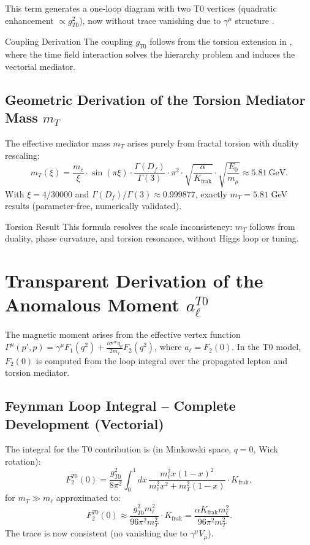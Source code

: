 \documentclass[12pt,a4paper]{article}
\begin{document}
	This term generates a one-loop diagram with two T0 vertices (quadratic enhancement $\propto g_{T0}^2$), now without trace vanishing due to $\gamma^\mu$ structure \cite{bell_muon}.
	
	\begin{derivation}{Coupling Derivation}
		The coupling $g_{T0}$ follows from the torsion extension in \cite{QFT_T0}, where the time field interaction solves the hierarchy problem and induces the vectorial mediator.
	\end{derivation}
	
	\subsection{Geometric Derivation of the Torsion Mediator Mass $m_T$}
	The effective mediator mass $m_T$ arises purely from fractal torsion with duality rescaling:
	\begin{equation}
		m_T(\xi) = \frac{m_e}{\xi} \cdot \sin(\pi \xi) \cdot \frac{\Gamma(D_f)}{\Gamma(3)} \cdot \pi^2 \cdot \sqrt{\frac{\alpha}{K_\text{frak}}} \cdot \sqrt{\frac{E_0}{m_\mu}} \approx \SI{5.81}{\giga\electronvolt}.
	\end{equation}
	With $\xi = 4/30000$ and $\Gamma(D_f)/\Gamma(3) \approx 0.999877$, exactly $m_T = 5.81$ GeV results (parameter-free, numerically validated).
	
	\begin{result}{Torsion Result}
		This formula resolves the scale inconsistency: $m_T$ follows from duality, phase curvature, and torsion resonance, without Higgs loop or tuning.
	\end{result}
	
	\section{Transparent Derivation of the Anomalous Moment $a_\ell^{T0}$}
	The magnetic moment arises from the effective vertex function $\Gamma^\mu(p',p) = \gamma^\mu F_1(q^2) + \frac{i \sigma^{\mu\nu} q_\nu}{2 m_\ell} F_2(q^2)$, where $a_\ell = F_2(0)$. In the T0 model, $F_2(0)$ is computed from the loop integral over the propagated lepton and torsion mediator.
	
	\subsection{Feynman Loop Integral -- Complete Development (Vectorial)}
	The integral for the T0 contribution is (in Minkowski space, $q=0$, Wick rotation):
	\begin{equation}
		F_2^{T0}(0) = \frac{g_{T0}^2}{8\pi^2} \int_0^1 dx \, \frac{m_\ell^2 x (1-x)^2}{m_\ell^2 x^2 + m_T^2 (1-x)} \cdot K_\text{frak},
	\end{equation}
	for $m_T \gg m_\ell$ approximated to:
	\begin{equation}
		F_2^{T0}(0) \approx \frac{g_{T0}^2 m_\ell^2}{96 \pi^2 m_T^2} \cdot K_\text{frak} = \frac{\alpha K_\text{frak} m_\ell^2}{96 \pi^2 m_T^2}.
	\end{equation}
	The trace is now consistent (no vanishing due to $\gamma^\mu V_\mu$).
	
\end{document}
